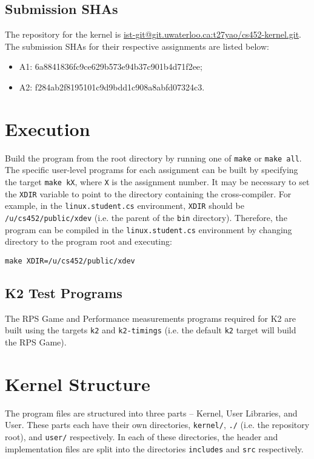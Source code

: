 \documentclass[12pt, titlepage]{article}
\begin{document}
    \subsection{Submission SHAs}

    The repository for the kernel is \href{https://git.uwaterloo.ca/t27yao/cs452-kernel}{ist-git@git.uwaterloo.ca:t27yao/cs452-kernel.git}. The submission SHAs for their respective assignments are listed below:
    \begin{itemize}
        \item A1: 6a8841836fc9ce629b573e94b37c901b4d71f2ee;
        \item A2: f284ab2f8195101c9d9bdd1c908a8abfd07324c3.
    \end{itemize}

    \section{Execution}

    Build the program from the root directory by running one of \verb`make` or \verb`make all`. The specific user-level programs for each assignment can be built by specifying the target \verb`make kX`, where \verb`X` is the assignment number. It may be necessary to set the \verb`XDIR` variable to point to the directory containing the cross-compiler. For example, in the \verb`linux.student.cs` environment, \verb`XDIR` should be \verb`/u/cs452/public/xdev` (i.e. the parent of the \verb`bin` directory). Therefore, the program can be compiled in the \verb`linux.student.cs` environment by changing directory to the program root and executing:
    \begin{verbatim}
make XDIR=/u/cs452/public/xdev
    \end{verbatim}

    \subsection{K2 Test Programs}
    The RPS Game and Performance measurements programs required for K2 are built using the targets \verb`k2` and \verb`k2-timings` (i.e. the default \verb`k2` target will build the RPS Game).

    \section{Kernel Structure}

    The program files are structured into three parts -- Kernel, User Libraries, and User. These parts each have their own directories, \verb`kernel/`, \verb`./` (i.e. the repository root), and \verb`user/` respectively. In each of these directories, the header and implementation files are split into the directories \verb`includes` and \verb`src` respectively.
\end{document}
